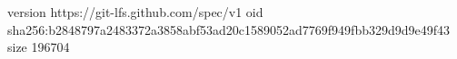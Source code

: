 version https://git-lfs.github.com/spec/v1
oid sha256:b2848797a2483372a3858abf53ad20c1589052ad7769f949fbb329d9d9e49f43
size 196704
